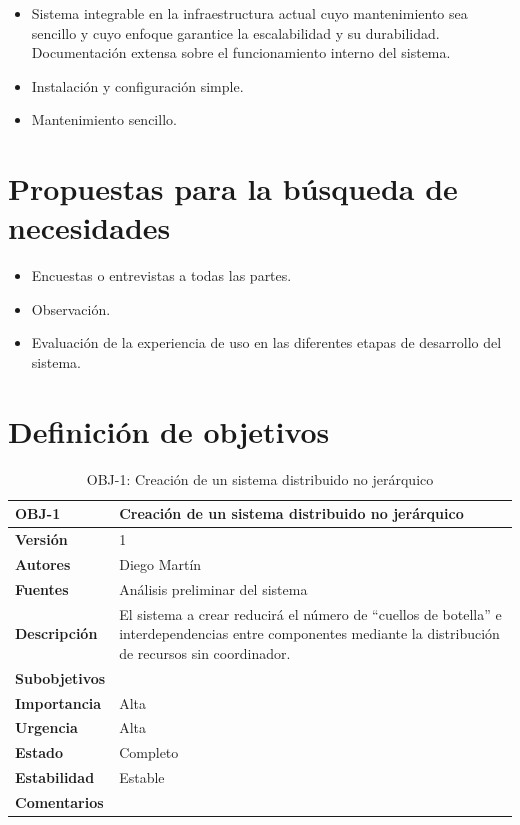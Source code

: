 \begin{itemize}
  \item Sistema integrable en la infraestructura actual cuyo mantenimiento sea sencillo y cuyo enfoque garantice la escalabilidad y su durabilidad. Documentación extensa sobre el funcionamiento interno del sistema.
  \item Instalación y configuración simple.
  \item Mantenimiento sencillo.
\end{itemize}

\section{Propuestas para la búsqueda de necesidades}

\begin{itemize}
  \item Encuestas o entrevistas a todas las partes.
  \item Observación.
  \item Evaluación de la experiencia de uso en las diferentes etapas de desarrollo del sistema.
\end{itemize}

\section{Definición de objetivos}

\begin{table}[H]
\begin{tabular}{|p{2.5cm}|p{10cm}|}
\hline
\textbf{OBJ-1} &Creación de un sistema distribuido no jerárquico\\
\hline
\textbf{Versión} &1\\
\hline
\textbf{Autores} &Diego Martín\\
\hline
\textbf{Fuentes} &Análisis preliminar del sistema\\
\hline
\textbf{Descripción} &El sistema a crear reducirá el número de ``cuellos de botella'' e interdependencias entre componentes mediante la distribución de recursos sin coordinador.\\
\hline
\textbf{Subobjetivos} &\\
\hline
\textbf{Importancia} &Alta\\
\hline
\textbf{Urgencia} &Alta\\
\hline
\textbf{Estado} &Completo\\
\hline
\textbf{Estabilidad} &Estable\\
\hline
\textbf{Comentarios} &\\
\hline
\end{tabular}
\caption{OBJ-1: Creación de un sistema distribuido no jerárquico}
\end{table}

